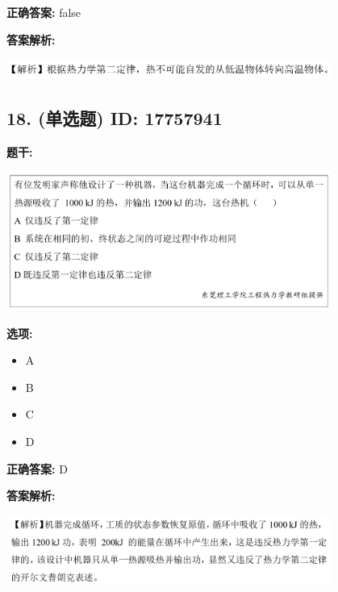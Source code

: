 \documentclass[12pt]{article}
\begin{document}
\textbf{正确答案:}
false

\textbf{答案解析:}


\begin{center}\includegraphics[width=0.8\textwidth, height=0.25\textheight, keepaspectratio]{question_17_17757950/correct_replay_img_1.png}\end{center}

\vspace{0.5em}\hrulefill\vspace{1em}

\subsection*{18. (单选题) \small ID: 17757941}

\textbf{题干:}


\begin{center}\includegraphics[width=0.8\textwidth, height=0.25\textheight, keepaspectratio]{question_18_17757941/title_img_1.png}\end{center}

\textbf{选项:}
\begin{itemize}[leftmargin=*]
  \item A

  \item B

  \item C

  \item D

\end{itemize}

\textbf{正确答案:}
D

\textbf{答案解析:}


\begin{center}\includegraphics[width=0.8\textwidth, height=0.25\textheight, keepaspectratio]{question_18_17757941/correct_replay_img_1.png}\end{center}
\end{document}
